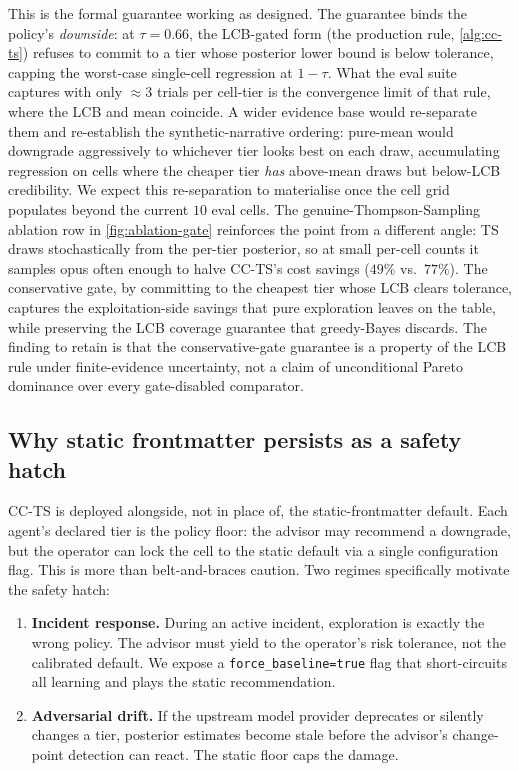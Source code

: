 This is the formal guarantee working as designed. The guarantee binds
the policy's \emph{downside}: at $\tau=0.66$, the LCB-gated form (the
production rule, \cref{alg:cc-ts}) refuses to commit to a tier whose
posterior lower bound is below tolerance, capping the worst-case
single-cell regression at $1-\tau$. What the eval suite captures with
only $\approx 3$ trials per cell-tier is the convergence limit of that
rule, where the LCB and mean coincide. A wider evidence base would
re-separate them and re-establish the synthetic-narrative ordering:
pure-mean would downgrade aggressively to whichever tier looks best on
each draw, accumulating regression on cells where the cheaper tier
\emph{has} above-mean draws but below-LCB credibility. We expect this
re-separation to materialise once the cell grid populates beyond the
current $10$ eval cells. The genuine-Thompson-Sampling ablation row
in \cref{fig:ablation-gate} reinforces the point from a different
angle: TS draws stochastically from the per-tier posterior, so at
small per-cell counts it samples opus often enough to halve CC-TS's
cost savings ($49\%$ vs.\ $77\%$). The conservative gate, by
committing to the cheapest tier whose LCB clears tolerance, captures
the exploitation-side savings that pure exploration leaves on the
table, while preserving the LCB coverage guarantee that greedy-Bayes
discards. The finding to retain is that the conservative-gate
guarantee is a property of the LCB rule under finite-evidence
uncertainty, not a claim of unconditional Pareto dominance over every
gate-disabled comparator.

\subsection{Why static frontmatter persists as a safety hatch}

CC-TS is deployed alongside, not in place of, the static-frontmatter
default. Each agent's declared tier is the policy floor: the advisor may
recommend a downgrade, but the operator can lock the cell to the static
default via a single configuration flag. This is more than belt-and-braces
caution. Two regimes specifically motivate the safety hatch:

\begin{enumerate}[leftmargin=*]
  \item \textbf{Incident response.} During an active incident, exploration
        is exactly the wrong policy. The advisor must yield to the
        operator's risk tolerance, not the calibrated default. We expose a
        \texttt{force\_baseline=true} flag that short-circuits all learning
        and plays the static recommendation.
  \item \textbf{Adversarial drift.} If the upstream model provider
        deprecates or silently changes a tier, posterior estimates become
        stale before the advisor's change-point detection can react. The
        static floor caps the damage.
\end{enumerate}

